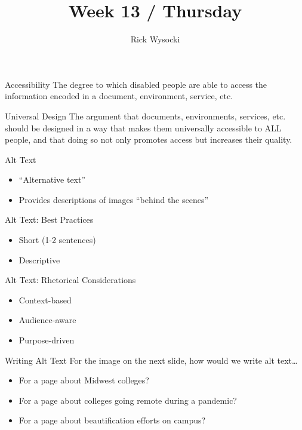 \documentclass[presentation]{beamer}
\author{Rick Wysocki}
\date{}
\title{Week 13 / Thursday}
\begin{document}
\maketitle
\begin{frame}[label={sec:org06e39b7}]{Accessibility}
The degree to which disabled people are able to access the information encoded in a document, environment, service, etc.
\end{frame}
\begin{frame}[label={sec:org7047513}]{Universal Design}
The argument that documents, environments, services, etc. should be designed in a way that makes them universally accessible to ALL people, and that doing so not only promotes access but increases their quality.
\end{frame}
\begin{frame}[label={sec:org7c30ed1}]{Alt Text}
\begin{itemize}
\item “Alternative text”
\item Provides descriptions of images “behind the scenes”
\end{itemize}
\end{frame}
\begin{frame}[label={sec:org11d913a}]{Alt Text: Best Practices}
\begin{itemize}
\item Short (1-2 sentences)
\item Descriptive
\end{itemize}
\end{frame}
\begin{frame}[label={sec:org6a4c387}]{Alt Text: Rhetorical Considerations}
\begin{itemize}
\item Context-based
\item Audience-aware
\item Purpose-driven
\end{itemize}
\end{frame}
\begin{frame}[label={sec:orgd689235}]{Writing Alt Text}
For the image on the next slide, how would we write alt text\ldots{} 
\begin{itemize}
\item For a page about Midwest colleges?
\item For a page about colleges going remote during a pandemic?
\item For a page about beautification efforts on campus?
\end{itemize}
\end{frame}
\end{document}
